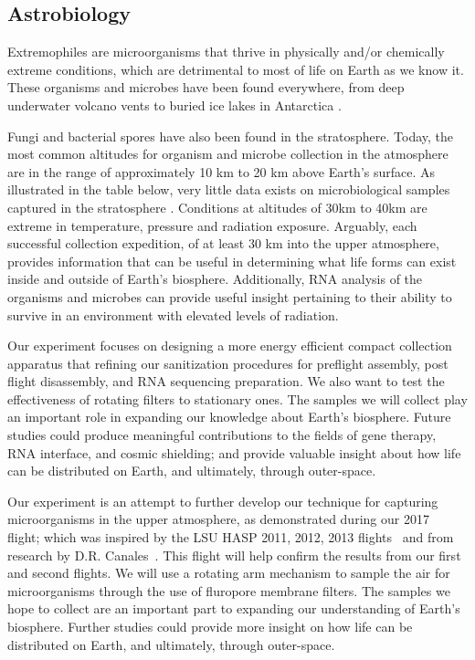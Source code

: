 \subsection{Astrobiology}
\label{sec:AstrobiologyBackground}

Extremophiles are microorganisms that thrive in physically and/or chemically extreme conditions, which are detrimental to most of life on Earth as we know it. These organisms and microbes have been found everywhere, from deep underwater volcano vents to buried ice lakes in Antarctica \cite{Extremophiles}. 

Fungi and bacterial spores have also been found in the stratosphere. Today, the most common altitudes for organism and microbe collection in the atmosphere are in the range of approximately 10 km to 20 km above Earth’s surface. As illustrated in the table below, very little data exists on microbiological samples captured in the stratosphere \cite{Extremophiles}. Conditions at altitudes of 30km to 40km are extreme in temperature, pressure and radiation exposure. Arguably, each successful collection expedition, of at least 30 km into the upper atmosphere, provides information that can be useful in determining what life forms can exist inside and outside of Earth’s biosphere. Additionally, RNA analysis of the organisms and microbes can provide useful insight pertaining to their ability to survive in an environment with elevated levels of radiation.  

 Our experiment focuses on designing a more energy efficient compact collection apparatus that refining our sanitization procedures for preflight assembly, post flight disassembly, and RNA sequencing preparation. We also want to test the effectiveness of rotating filters to stationary ones. The samples we will collect play an important role in expanding our knowledge about Earth’s biosphere. Future studies could produce meaningful contributions to the fields of gene therapy, RNA interface, and cosmic shielding; and provide valuable insight about how life can be distributed on Earth, and ultimately, through outer-space.


Our experiment is an attempt to further develop our technique for capturing microorganisms in the upper atmosphere, as demonstrated during our 2017~\cite{SORA1} flight; which was inspired by the LSU HASP 2011, 2012, 2013 flights~\cite{LSU} and from research by D.R. Canales~\cite{Canales}.  This flight will help confirm the results from our first and second flights\cite{SORA2}.  We will use a rotating arm mechanism to sample the air for microorganisms through the use of fluropore membrane filters. The samples we hope to collect are an important part to expanding our understanding of Earth's biosphere. Further studies could provide more insight on how life can be distributed on Earth, and ultimately, through outer-space.

